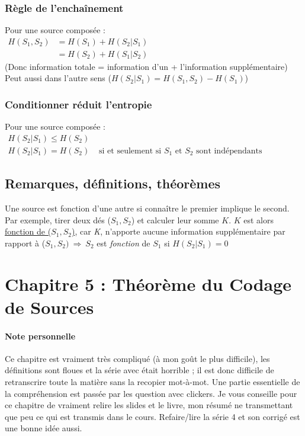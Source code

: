 \documentclass[11pt,a4paper]{article}
\renewcommand{\)}{\right)}
\renewcommand{\(}{\left(}
\begin{document}
\subsubsection{Règle de l'enchaînement}
\label{enchainement}
Pour une source composée :\\
$\begin{array}{ll}
	H(S_1,S_2) 	&= H(S_1) + H(S_2|S_1)\\
				&= H(S_2) + H(S_1|S_2)
\end{array}$\\
(Donc information totale = information d'un + l'information supplémentaire)\\
Peut aussi dans l'autre sens ($H(S_2|S_1) = H(S_1,S_2) - H(S_1)$)

\subsubsection{Conditionner réduit l'entropie}
Pour une source composée :\\	
$\begin{array}{ll}
	H(S_2|S_1) \leq H(S_2) 	&\\
	H(S_2|S_1) = H(S_2) &\text{ si et seulement si $S_1$ et $S_2$ sont indépendants}
\end{array}$

\subsection{Remarques, définitions, théorèmes}
Une source est fonction d'une autre si connaître le premier implique le second. Par exemple, tirer deux dés ($S_1, S_2$) et calculer leur somme $K$. $K$ est alors \uline{fonction de ($S_1,S_2$)}, car \textit{K}, n'apporte aucune information supplémentaire par rapport à ($S_1,S_2)\ \Rightarrow\ S_2$ est \textit{fonction} de $S_1$ si $H(S_2|S_1) = 0$

\section[Théorème du Codage de Sources]{Chapitre 5 : Théorème du Codage de Sources}
\paragraph{Note personnelle}
Ce chapitre est vraiment très compliqué (à mon goût le plus difficile), les définitions sont floues et la série avec était horrible ; il est donc difficile de retranscrire toute la matière sans la recopier mot-à-mot. Une partie essentielle de la compréhension est passée par les question avec clickers. Je vous conseille pour ce chapitre de vraiment relire les slides et le livre, mon résumé ne transmettant que peu ce qui est transmis dans le cours. Refaire/lire la série 4 et son corrigé est une bonne idée aussi.
\end{document}
